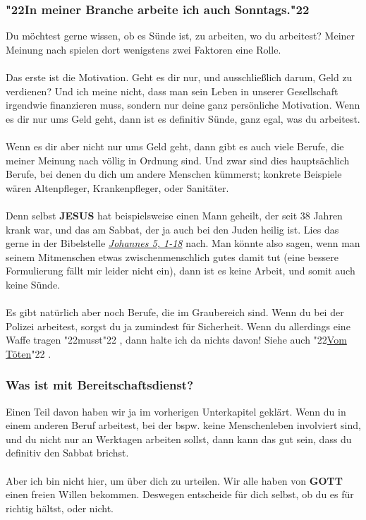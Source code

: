 \documentclass[12pt,a5paper]{article}
\newcommand{\Gott}[0]{\textbf{GOTT}}
\newcommand{\Jesus}[0]{\textbf{JESUS}}
\newcommand{\q}[1]{\char"22{#1}\char"22 }
\begin{document}
	\subsubsection{\q{In meiner Branche arbeite ich auch Sonntags.}}
		Du m\"ochtest gerne wissen,
		ob es S\"unde ist,
		zu arbeiten,
		wo du arbeitest?
		Meiner Meinung nach spielen dort wenigstens zwei Faktoren eine Rolle.
		\\
		\\
		Das erste ist die Motivation.
		Geht es dir nur,
		und ausschlie{\ss}lich darum,
		Geld zu verdienen?
		Und ich meine nicht,
		dass man sein Leben in unserer Gesellschaft irgendwie finanzieren muss,
		sondern nur deine ganz pers\"onliche Motivation.
		Wenn es dir nur ums Geld geht,
		dann ist es definitiv S\"unde,
		ganz egal,
		was du arbeitest.
		\\
		\\
		Wenn es dir aber nicht nur ums Geld geht,
		dann gibt es auch viele Berufe,
		die meiner Meinung nach v\"ollig in Ordnung sind.
		Und zwar sind dies haupts\"achlich Berufe,
		bei denen du dich um andere Menschen k\"ummerst;
		konkrete Beispiele w\"aren
		Altenpfleger,
		Krankenpfleger,
		oder Sanit\"ater.
		\\
		\\
		Denn selbst {\Jesus} hat beispielsweise einen Mann geheilt,
		der seit 38 Jahren krank war,
		und das am Sabbat,
		der ja auch bei den Juden heilig ist.
		Lies das gerne in der Bibelstelle \textit{\href{https://www.die-bibel.de/bibeln/online-bibeln/lesen/LU17/JHN.5/Johannes-5}{Johannes 5, 1-18}} nach.
		Man k\"onnte also sagen,
		wenn man seinem Mitmenschen etwas zwischenmenschlich gutes damit tut
		(eine bessere Formulierung f\"allt mir leider nicht ein),
		dann ist es keine Arbeit,
		und somit auch keine S\"unde.
		\\
		\\
		Es gibt nat\"urlich aber noch Berufe,
		die im Graubereich sind.
		Wenn du bei der Polizei arbeitest,
		sorgst du ja zumindest f\"ur Sicherheit.
		Wenn du allerdings eine Waffe tragen \q{musst},
		dann halte ich da nichts davon!
		Siehe auch \q{\hyperref[VomToeten]{Vom T\"oten}}.

	\subsubsection{Was ist mit Bereitschaftsdienst?}
		Einen Teil davon haben wir ja im vorherigen Unterkapitel gekl\"art.
		Wenn du in einem anderen Beruf arbeitest,
		bei der bspw. keine Menschenleben involviert sind,
		und du nicht nur an Werktagen arbeiten sollst,
		dann kann das gut sein,
		dass du definitiv den Sabbat brichst.
		\\
		\\
		Aber ich bin nicht hier,
		um \"uber dich zu urteilen.
		Wir alle haben von {\Gott} einen freien Willen bekommen.
		Deswegen entscheide f\"ur dich selbst,
		ob du es f\"ur richtig h\"altst,
		oder nicht.
\end{document}
